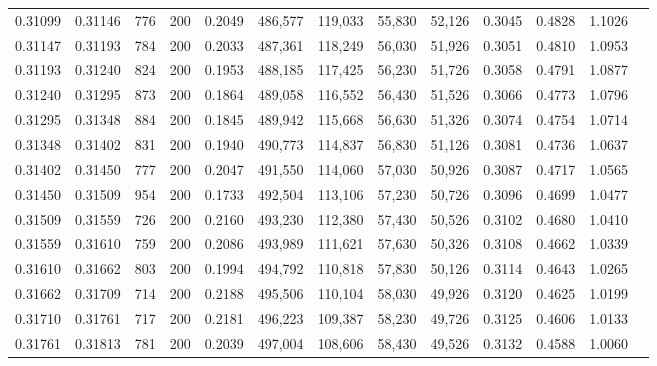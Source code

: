 \begin{tabular}{rrrrrrrrrrrrr}
0.31099 & 0.31146 &   776 & 200 &                                     0.2049 & 486,577 & 119,033 &  55,830 &  52,126 & 0.3045 & 0.4828 & 1.1026 \\
0.31147 & 0.31193 &   784 & 200 &                                     0.2033 & 487,361 & 118,249 &  56,030 &  51,926 & 0.3051 & 0.4810 & 1.0953 \\
0.31193 & 0.31240 &   824 & 200 &                                     0.1953 & 488,185 & 117,425 &  56,230 &  51,726 & 0.3058 & 0.4791 & 1.0877 \\
0.31240 & 0.31295 &   873 & 200 &                                     0.1864 & 489,058 & 116,552 &  56,430 &  51,526 & 0.3066 & 0.4773 & 1.0796 \\
0.31295 & 0.31348 &   884 & 200 &                                     0.1845 & 489,942 & 115,668 &  56,630 &  51,326 & 0.3074 & 0.4754 & 1.0714 \\
0.31348 & 0.31402 &   831 & 200 &                                     0.1940 & 490,773 & 114,837 &  56,830 &  51,126 & 0.3081 & 0.4736 & 1.0637 \\
0.31402 & 0.31450 &   777 & 200 &                                     0.2047 & 491,550 & 114,060 &  57,030 &  50,926 & 0.3087 & 0.4717 & 1.0565 \\
0.31450 & 0.31509 &   954 & 200 &                                     0.1733 & 492,504 & 113,106 &  57,230 &  50,726 & 0.3096 & 0.4699 & 1.0477 \\
0.31509 & 0.31559 &   726 & 200 &                                     0.2160 & 493,230 & 112,380 &  57,430 &  50,526 & 0.3102 & 0.4680 & 1.0410 \\
0.31559 & 0.31610 &   759 & 200 &                                     0.2086 & 493,989 & 111,621 &  57,630 &  50,326 & 0.3108 & 0.4662 & 1.0339 \\
0.31610 & 0.31662 &   803 & 200 &                                     0.1994 & 494,792 & 110,818 &  57,830 &  50,126 & 0.3114 & 0.4643 & 1.0265 \\
0.31662 & 0.31709 &   714 & 200 &                                     0.2188 & 495,506 & 110,104 &  58,030 &  49,926 & 0.3120 & 0.4625 & 1.0199 \\
0.31710 & 0.31761 &   717 & 200 &                                     0.2181 & 496,223 & 109,387 &  58,230 &  49,726 & 0.3125 & 0.4606 & 1.0133 \\
0.31761 & 0.31813 &   781 & 200 &                                     0.2039 & 497,004 & 108,606 &  58,430 &  49,526 & 0.3132 & 0.4588 & 1.0060 \\

\end{tabular}
